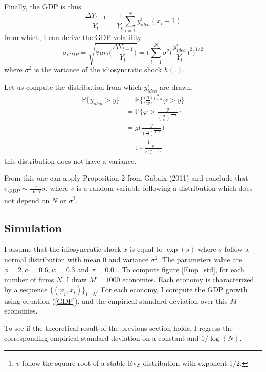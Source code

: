 \documentclass[12pt]{article}
\begin{document}
Finally, the GDP is thus
\begin{equation*}
\frac{\Delta Y_{t+1}}{Y_t} = \frac{1}{Y_t} \sum_{i=1}^N y^i_{idea} ( x_i - 1 )
\end{equation*}
from which, I can derive the GDP volatility
\begin{equation*}
  \sigma_{GDP} = \sqrt{\mathbb{V}ar_t \Big( \frac{\Delta Y_{t+1}}{Y_t} \Big) } = \Big( \sum_{i=1}^N \sigma^2 \Big( \frac{y^i_{idea}}{Y_t} \Big)^2 \Big)^{1/2}
\end{equation*}
where $\sigma^2$ is the variance of the idiosyncratic shock $h(.)$.

Let us compute the distribution from which $y^i_{idea}$ are drawn.
\begin{align*}
\mathbb{P}\{ y_{idea} > y \} &= \mathbb{P}\{ \Big( \frac{\alpha}{w} \Big)^{\frac{\alpha}{1-\alpha}} \varphi > y \} \\
&= \mathbb{P}\Big\{  \varphi > \frac{y}{( \frac{\alpha}{w} )^{\frac{\alpha}{1-\alpha}} } \Big\} \\
&= g\Big(\frac{y}{( \frac{\alpha}{w} )^{\frac{\alpha}{1-\alpha}} }\Big)\\
&=  \frac{1}{1+\frac{y}{\phi( \frac{\alpha}{w} )^{\frac{\alpha}{1-\alpha}} }}
\end{align*}
this distribution does not have a variance.

From this one can apply Proposition 2 from Gabaix (2011)  \nocite{Gaba11} and conclude that $\sigma_{GDP} \sim \frac{v}{\ln N}\sigma$, where $v$ is a random variable following a distribution which does not depend on $N$ or $\sigma$\footnote{$v$ follow the square root of a stable l\'evy distribution with exponent $1/2$.}.

\subsection{Simulation}

I assume that the idiosyncratic shock $x$ is equal to $\exp(s)$ where $s$ follow a normal distribution with mean 0 and variance $\sigma^2$. The parameters value are $\phi=2, \alpha=0.6, w=0.3$ and $\sigma=0.01$. To compute figure \ref{Emp_std}, for each number of firms $N$, I draw $M=1000$ economies. Each economy is characterized by a sequence $\{ (\varphi_i,x_i)\}_{1 \ldots N}$. For each economy, I compute the GDP growth using equation (\ref{GDP}), and the empirical standard deviation over this $M$ economies.

To see if the theoretical result of the previous section holds, I regress the corresponding empirical standard deviation on a constant and $1/\log(N)$.
\end{document}
